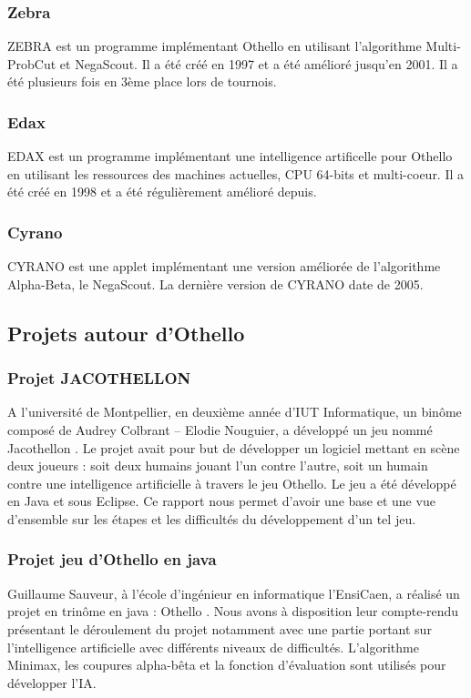 \documentclass[a4paper,12pt]{article}
\begin{document}
\subsubsection{Zebra}
ZEBRA \cite{3} est un programme implémentant Othello en utilisant
l'algorithme Multi-ProbCut et NegaScout. Il a été créé
en 1997 et a été amélioré jusqu'en 2001. Il a été plusieurs fois en 3ème place lors de tournois.

\subsubsection{Edax}
EDAX est un programme \cite{edax} implémentant une intelligence artificelle pour Othello en utilisant les ressources des machines actuelles, CPU 64-bits et multi-coeur. Il a été créé en 1998 et a été régulièrement amélioré depuis.

\subsubsection{Cyrano}
CYRANO \cite{cyrano} est une applet implémentant une version améliorée de l'algorithme Alpha-Beta, le NegaScout. La dernière version de CYRANO date de 2005.

\subsection{Projets autour d'Othello}

\subsubsection{Projet JACOTHELLON}
A l'université de Montpellier, en deuxième année d'IUT Informatique,
un binôme composé de Audrey Colbrant – Elodie Nouguier, a développé un
jeu nommé Jacothellon \cite{jacothellon}. 
Le projet avait pour but de développer un logiciel mettant en scène deux joueurs : soit deux humains jouant l'un contre l'autre, soit un humain contre une intelligence artificielle à travers le jeu Othello. Le jeu a été développé en Java et sous Eclipse.
Ce rapport nous permet d'avoir une base et une vue d'ensemble sur les
étapes et les difficultés du développement d'un tel jeu.

\subsubsection{Projet jeu d'Othello en java}
Guillaume Sauveur, à l'école d'ingénieur en informatique l'EnsiCaen, a
réalisé un projet en trinôme en java : Othello
\cite{projothello1}. Nous avons à disposition leur compte-rendu
présentant le déroulement du projet notamment avec une partie
portant sur l'intelligence artificielle avec différents niveaux de
difficultés. L'algorithme Minimax, les coupures alpha-bêta et
la fonction d'évaluation sont utilisés pour développer l'IA.
\end{document}

